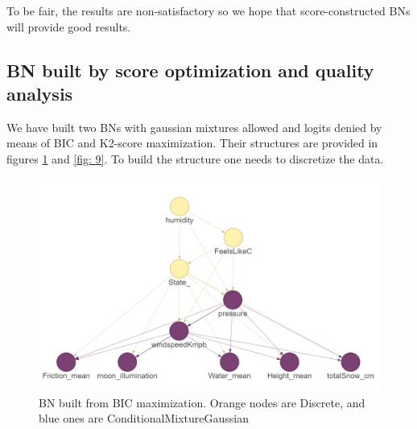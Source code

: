 \documentclass[12pt, bachelor, substylefile = algo_title.rtx]{disser}
\theoremstyle{definition}
\begin{document}
To be fair, the results are non-satisfactory so we hope that score-constructed BNs will provide good results. 

\subsection{BN built by score optimization and quality analysis}
We have built two BNs with gaussian mixtures allowed and logits denied by means of BIC and K2-score maximization. Their structures are provided in figures \ref{fig: 8} and \ref{fig: 9}.
To build the structure one needs to discretize the data.
\begin{figure}[!h]
\centering
   \begin{minipage}{0.7\textwidth}
     \includegraphics[width=\linewidth]{bn}
   \end{minipage}
\caption{BN built from BIC maximization. Orange nodes are Discrete, and blue ones are ConditionalMixtureGaussian}
\label{fig: 8}
\end{figure}
\end{document}

